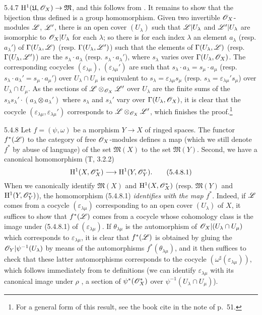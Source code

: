 \begin{env}{5.4.7}
$\mathrm{H}^1(\mathfrak{U},\mathscr{O}_X)\to\mathfrak{M}$, and this follows from . It
remains to show that
the bijection thus defined is a group homomorphism. Given two invertible $\mathscr{O}_X$-modules
$\mathscr{L}$, $\mathscr{L}'$, there is an open cover $(U_\lambda)$ such that $\mathscr{L}|U_\lambda$ and
$\mathscr{L}'|U_\lambda$ are isomorphic to $\mathscr{O}_X|U_\lambda$ for each $\lambda$; so there is for
each index $\lambda$ an element $a_\lambda$ (resp. $a_\lambda'$) of
$\Gamma(U_\lambda,\mathscr{L})$ (resp. $\Gamma(U_\lambda,\mathscr{L}')$) such that the elements of
$\Gamma(U_\lambda,\mathscr{L})$ (resp. $\Gamma(U_\lambda,\mathscr{L}')$) are the
$s_\lambda\cdot a_\lambda$ (resp. $s_\lambda\cdot a_\lambda'$), where $s_\lambda$ varies over
$\Gamma(U_\lambda,\mathscr{O}_X)$. The corresponding cocycles $(\varepsilon_{\lambda\mu})$,
$(\varepsilon_{\lambda\mu}')$ are such that $s_\lambda\cdot a_\lambda=s_\mu\cdot a_\mu$
(resp. $s_\lambda\cdot a_\lambda'=s_\mu\cdot a_\mu'$) over $U_\lambda\cap U_\mu$ is
equivalent to $s_\lambda=\varepsilon_{\lambda\mu}s_\mu$
(resp. $s_\lambda=\varepsilon_{\lambda\mu}'s_\mu$) over $U_\lambda\cap U_\mu$. As the
sections of $\mathscr{L}\otimes_{\mathscr{O}_X}\mathscr{L}'$ over $U_\lambda$ are the finite sums of the
$s_\lambda s_\lambda'\cdot(a_\lambda\otimes a_\lambda')$ where $s_\lambda$ and $s_\lambda'$
vary over $\Gamma(U_\lambda,\mathscr{O}_X)$, it is clear that the cocycle
$(\varepsilon_{\lambda\mu},\varepsilon_{\lambda\mu}')$ corresponds to
$\mathscr{L}\otimes_{\mathscr{O}_X}\mathscr{L}'$, which finishes the proof.\footnote{For a general form of this
result, see the book cite in the note of p.~51.}
\end{env}

\begin{env}{5.4.8}
\label{env-0.5.4.8}
Let $f=(\psi,\omega)$ be a morphism $Y\to X$ of ringed spaces. The functor $f^*(\mathscr{L})$ to
the category of free $\mathscr{O}_X$-modules defines a map (which we still denote $f^*$ by abuse of
language) of the set $\mathfrak{M}(X)$ to the set $\mathfrak{M}(Y)$. Second, we have a
canonical homomorphism (T, 3.2.2)
\[
  \mathrm{H}^1(X,\mathscr{O}_X^*)\longrightarrow\mathrm{H}^1(Y,\mathscr{O}_Y^*).
  \tag{5.4.8.1}
\]
When we canonically identify  $\mathfrak{M}(X)$ and $\mathrm{H}^1(X,\mathscr{O}_X^*)$
(resp. $\mathfrak{M}(Y)$ and $\mathrm{H}^1(Y,\mathscr{O}_Y^*)$), the homomorphism (5.4.8.1) \emph{identifies
with the map $f^*$}. Indeed, if $\mathscr{L}$ comes from a cocycle $(\varepsilon_{\lambda\mu})$
corresponding to an open cover $(U_\lambda)$ of $X$, it suffices to show that $f^*(\mathscr{L})$
comes from a cocycle whose cohomology class is the image under (5.4.8.1) of
$(\varepsilon_{\lambda\mu})$. If $\theta_{\lambda\mu}$ is the automorphism of
$\mathscr{O}_X|(U_\lambda\cap U_\mu)$ which corresponds to $\varepsilon_{\lambda\mu}$, it is clear
that $f^*(\mathscr{L})$ is obtained by gluing the $\mathscr{O}_Y|\psi^{-1}(U_\lambda)$ by means of the
automorphisms $f^*(\theta_{\lambda\mu})$, and it then suffices to check that these latter
automorphisms corresponds to the cocycle $(\omega^\sharp(\varepsilon_{\lambda\mu}))$, which
follows immediately from te definitions (we can identify $\varepsilon_{\lambda\mu}$ with its
canonical image under $\rho$ , a section of $\psi^*(\mathscr{O}_X^*)$ over
$\psi^{-1}(U_\lambda\cap U_\mu)$).
\end{env}

